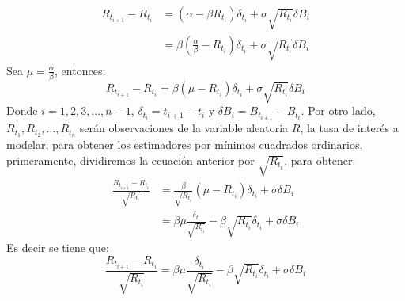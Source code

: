 \documentclass[11pt,notitlepage]{article}
\begin{document}
        \begin{align*}
             R_{t_{i+1}} - R_{t_i} &= (\alpha - \beta R_{t_i})\delta_{t_i}  + \sigma\sqrt{R_{t_i}}\delta B_i\\
                                   &= \beta\left(\frac{\alpha}{\beta} -   R_{t_i}\right)\delta_{t_i}  + \sigma\sqrt{R_{t_i}}\delta B_i
        \end{align*}
        Sea \(\mu = \frac{\alpha}{\beta}\), entonces: 
        \begin{equation*}
              R_{t_{i+1}} - R_{t_i} = \beta\left(\mu -   R_{t_i}\right)\delta_{t_i} + \sigma\sqrt{R_{t_i}}\delta B_i
        \end{equation*}
        Donde \(i = 1,2,3,...,n-1\), \(\delta_{t_i}  = t_{i+1} - t_{i}\) y \(\delta B_i = B_{t_{i+1}} - B_{t_i}\). Por otro lado, \(R_{t_1},R_{t_2},\hdots,R_{t_n}\) serán observaciones de la variable aleatoria \(R\), la tasa de interés a modelar, para obtener los estimadores por mínimos cuadrados ordinarios, primeramente, dividiremos la ecuación anterior por \(\sqrt{R_{t_i}}\), para obtener: 
        \begin{align*}
            \frac{ R_{t_{i+1}} - R_{t_i}}{\sqrt{R_{t_i}}} &= \frac{\beta}{\sqrt{R_{t_i}}}(\mu - R_{t_i})\delta_{t_i} +  \sigma\delta B_i\\
                                                          &=  \beta\mu\frac{\delta_{t_i}}{\sqrt{R_{t_i}}} - \beta\sqrt{R_{t_i}}\delta_{t_i} + \sigma\delta B_i
        \end{align*}
        Es decir se tiene que: 
        \begin{equation}\label{SII.CIR.8}
            \frac{ R_{t_{i+1}} - R_{t_i}}{\sqrt{R_{t_i}}} = \beta\mu\frac{\delta_{t_i}}{\sqrt{R_{t_i}}} - \beta\sqrt{R_{t_i}}\delta_{t_i} + \sigma\delta B_i
        \end{equation}
        
\end{document}
